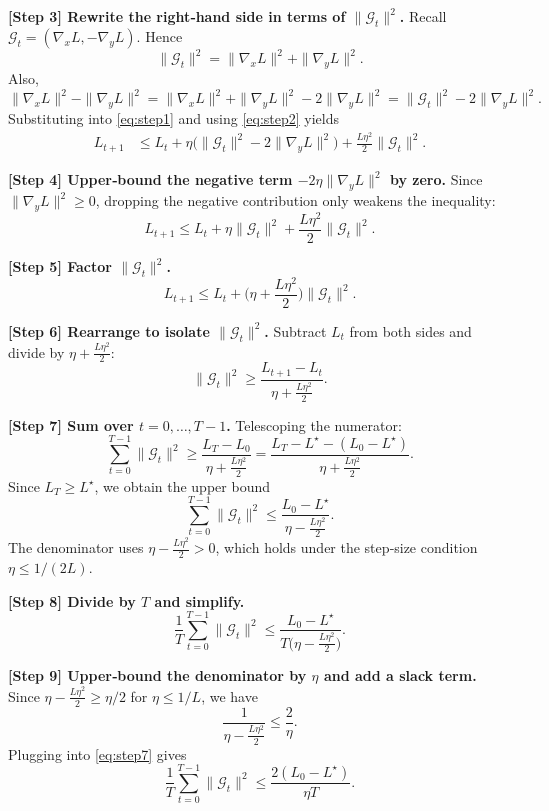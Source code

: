 \documentclass{article}
\begin{document}
\noindent\textbf{[Step 3] Rewrite the right‑hand side in terms of $\|\mathcal{G}_t\|^2$.}  
Recall $\mathcal{G}_t=(\nabla_x L,-\nabla_y L)$. Hence
\[
\|\mathcal{G}_t\|^2=\|\nabla_x L\|^2+\|\nabla_y L\|^2.
\]
Also,
\[
\|\nabla_x L\|^2-\|\nabla_y L\|^2
= \|\nabla_x L\|^2+\|\nabla_y L\|^2-2\|\nabla_y L\|^2
= \|\mathcal{G}_t\|^2-2\|\nabla_y L\|^2.
\]
Substituting into \eqref{eq:step1} and using \eqref{eq:step2} yields
\begin{align}
L_{t+1}
&\le L_t
+\eta\big(\|\mathcal{G}_t\|^2-2\|\nabla_y L\|^2\big)
+\frac{L\eta^2}{2}\|\mathcal{G}_t\|^2. \label{eq:step3}
\end{align}

\noindent\textbf{[Step 4] Upper‑bound the negative term $-2\eta\|\nabla_y L\|^2$ by zero.}  
Since $\|\nabla_y L\|^2\ge0$, dropping the negative contribution only weakens the inequality:
\begin{equation}
L_{t+1}\le L_t+\eta\|\mathcal{G}_t\|^2+\frac{L\eta^2}{2}\|\mathcal{G}_t\|^2.
\label{eq:step4}
\end{equation}

\noindent\textbf{[Step 5] Factor $\|\mathcal{G}_t\|^2$.}  
\[
L_{t+1}\le L_t+\Big(\eta+\frac{L\eta^2}{2}\Big)\|\mathcal{G}_t\|^2.
\tag{5.1}
\]

\noindent\textbf{[Step 6] Rearrange to isolate $\|\mathcal{G}_t\|^2$.}  
Subtract $L_t$ from both sides and divide by $\eta+\frac{L\eta^2}{2}$:
\begin{equation}
\|\mathcal{G}_t\|^2\ge \frac{L_{t+1}-L_t}{\eta+\frac{L\eta^2}{2}}.
\label{eq:step6}
\end{equation}

\noindent\textbf{[Step 7] Sum over $t=0,\dots,T-1$.}  
Telescoping the numerator:
\[
\sum_{t=0}^{T-1}\|\mathcal{G}_t\|^2
\ge \frac{L_T-L_0}{\eta+\frac{L\eta^2}{2}}
= \frac{L_T-L^\star-(L_0-L^\star)}{\eta+\frac{L\eta^2}{2}}.
\]
Since $L_T\ge L^\star$, we obtain the upper bound
\begin{equation}
\sum_{t=0}^{T-1}\|\mathcal{G}_t\|^2
\le \frac{L_0-L^\star}{\eta-\frac{L\eta^2}{2}}.
\label{eq:step7}
\end{equation}
The denominator uses $\eta-\frac{L\eta^2}{2}>0$, which holds under the step‑size condition $\eta\le 1/(2L)$.

\noindent\textbf{[Step 8] Divide by $T$ and simplify.}  
\[
\frac{1}{T}\sum_{t=0}^{T-1}\|\mathcal{G}_t\|^2
\le \frac{L_0-L^\star}{T\Big(\eta-\frac{L\eta^2}{2}\Big)}.
\tag{8.1}
\]

\noindent\textbf{[Step 9] Upper‑bound the denominator by $\eta$ and add a slack term.}  
Since $\eta-\frac{L\eta^2}{2}\ge \eta/2$ for $\eta\le 1/L$, we have
\[
\frac{1}{\eta-\frac{L\eta^2}{2}}
\le \frac{2}{\eta}.
\]
Plugging into \eqref{eq:step7} gives
\[
\frac{1}{T}\sum_{t=0}^{T-1}\|\mathcal{G}_t\|^2
\le \frac{2(L_0-L^\star)}{\eta T}.
\tag{9.1}
\]
\end{document}
